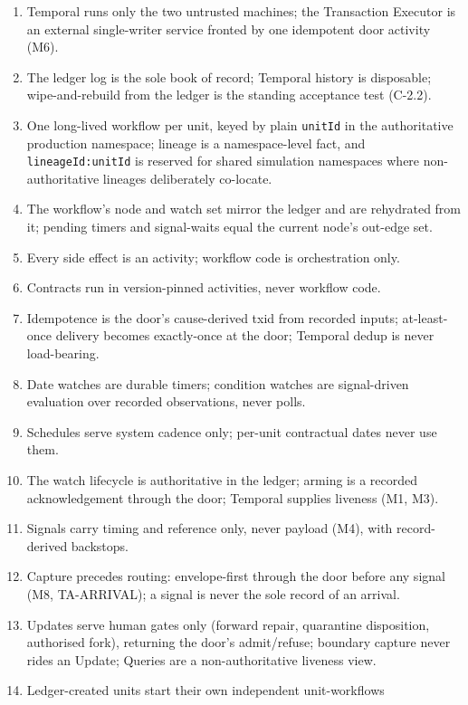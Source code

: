\documentclass[11pt,a4paper]{article}
\begin{document}
\begin{enumerate}[label=\textbf{R-\arabic*.}, leftmargin=*, itemsep=1pt]
\item Temporal runs only the two untrusted machines; the Transaction Executor is an
  external single-writer service fronted by one idempotent door activity (M6).
\item The ledger log is the sole book of record; Temporal history is disposable;
  wipe-and-rebuild from the ledger is the standing acceptance test (C-2.2).
\item One long-lived workflow per unit, keyed by plain \texttt{unitId} in the
  authoritative production namespace; lineage is a namespace-level fact, and
  \texttt{lineageId:unitId} is reserved for shared simulation namespaces where
  non-authoritative lineages deliberately co-locate.
\item The workflow's node and watch set mirror the ledger and are rehydrated from it;
  pending timers and signal-waits equal the current node's out-edge set.
\item Every side effect is an activity; workflow code is orchestration only.
\item Contracts run in version-pinned activities, never workflow code.
\item Idempotence is the door's cause-derived txid from recorded inputs; at-least-once
  delivery becomes exactly-once at the door; Temporal dedup is never load-bearing.
\item Date watches are durable timers; condition watches are signal-driven evaluation
  over recorded observations, never polls.
\item Schedules serve system cadence only; per-unit contractual dates never use them.
\item The watch lifecycle is authoritative in the ledger; arming is a recorded
  acknowledgement through the door; Temporal supplies liveness (M1, M3).
\item Signals carry timing and reference only, never payload (M4), with record-derived
  backstops.
\item Capture precedes routing: envelope-first through the door before any signal
  (M8, TA-ARRIVAL); a signal is never the sole record of an arrival.
\item Updates serve human gates only (forward repair, quarantine disposition,
  authorised fork), returning the door's admit/refuse; boundary capture never rides an
  Update; Queries are a non-authoritative liveness view.
\item Ledger-created units start their own independent unit-workflows

\end{enumerate}
\end{document}
